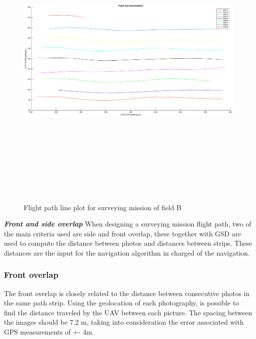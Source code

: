 \begin{figure}[h]
\includegraphics[width=\textwidth, height =15cm]{imagenes/strips.eps}
\caption{ Flight path line plot for surveying mission of field B}
\label{fig:FielB}
\end{figure}

\textit{\textbf{Front and side overlap}}
When designing a surveying mission flight path, two of the main criteria used are side and front overlap, these together with GSD are used to compute the distance between photos and distances between strips. These distances are the input for the navigation algorithm in charged of the navigation.
\subsubsection{Front overlap}
The front overlap is closely related to the distance between consecutive photos in the same path strip.  Using the geolocation of each photography, is possible to find the distance traveled by the UAV between each picture. The spacing between the images should be 7.2 m, taking into consideration the error associated with GPS measurements of +- 4m. 


